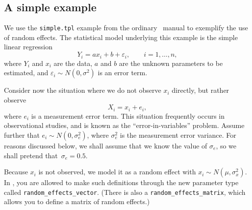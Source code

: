\documentclass{admbmanual}
\begin{document}
\subsection{A simple example}

We use the \texttt{simple.tpl} example from the ordinary \scAB\ manual to
exemplify the use of random effects. The statistical model underlying this
example is the simple linear regression
\[
Y_i=ax_i+b+\varepsilon_i,\qquad i=1,\ldots ,n,
\]
where $Y_i$ and $x_i$ are the data, $a$ and $b$ are the unknown parameters to be
estimated, and $\varepsilon_i\sim N(0,\sigma ^{2})$ is an error term.

Consider now the situation where we do not observe $x_i$ directly, but rather
observe
\[
X_i=x_i+e_i,
\]
where $e_i$ is a measurement error term. This situation frequently occurs in
observational studies, and is known as the ``error-in-variables'' problem.
Assume further that $e_i\sim N(0,\sigma_{e}^{2})$, where $\sigma_{e}^{2}$ is the
measurement error variance. For reasons discussed below, we shall assume that we
know the value of $\sigma_e$, so we shall pretend that~$\sigma_e=0.5$.

Because $x_i$ is not observed, we model it as a random effect with $x_i\sim
N(\mu ,\sigma_{x}^{2})$. In \scAR, you are allowed to make such definitions
through the new parameter type called \texttt{random\_effects\_vector}.
 (There is also a
\texttt{random\_effects\_matrix}, which allows you to define a matrix of random
effects.) 
\end{document}
